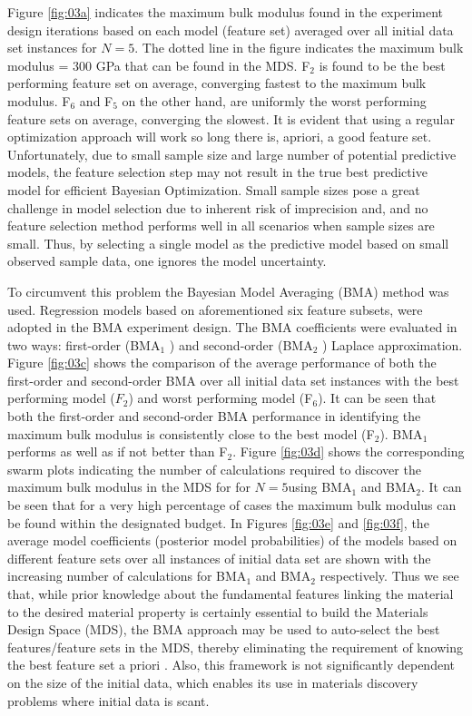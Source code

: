 \documentclass[utf8]{frontiersSCNS} %
\begin{document}
Figure \ref{fig:03a} indicates the maximum bulk modulus found in the experiment design iterations based on each model (feature set) averaged over all initial data set instances for $N= 5$. The dotted line in the figure indicates the maximum bulk modulus = 300 GPa that can be found in the MDS. F$_2$ is found to be the best performing feature set on average, converging fastest to the maximum bulk modulus. F$_6$ and F$_5$ on the other hand, are uniformly the worst performing feature sets on average, converging the slowest. It is evident that using a regular optimization approach will work so long there is, apriori, a good feature set.   Unfortunately, due to small sample size and large number of potential predictive models, the feature selection step may not result in the true best predictive model for efficient Bayesian Optimization. Small sample sizes pose a great challenge in model selection due to inherent risk of imprecision and, and no feature selection method performs well in all scenarios when sample sizes are small. Thus, by selecting a single model as the predictive model based on small observed sample data, one ignores the model uncertainty. 

To circumvent this problem the Bayesian Model Averaging (BMA) method was used. Regression models based on aforementioned six feature subsets, were adopted in the BMA experiment design.  The BMA coefficients were evaluated in two ways: first-order (BMA$_1$ ) and second-order (BMA$_2$ ) Laplace approximation. Figure \ref{fig:03c}  shows the comparison of the average performance of both the first-order and second-order BMA over all initial data set instances with the best performing model ($F_2$) and worst performing model (F$_6$). It can be seen that both the first-order and second-order BMA performance in identifying the maximum bulk modulus is consistently close to the best model (F$_2$). BMA$_1$ performs as well as if not better than F$_2$. Figure \ref{fig:03d} shows the corresponding swarm plots indicating the number of calculations required to discover the maximum bulk modulus in the MDS for for $N = 5$using BMA$_1$ and BMA$_2$. It can be seen that for a very high percentage of cases the maximum bulk modulus can be found within the designated budget. In Figures \ref{fig:03e} and \ref{fig:03f}, the average model coefficients (posterior model probabilities) of the models based on different feature sets over all instances of initial data set are shown with the increasing number of calculations for BMA$_1$ and BMA$_2$ respectively.  Thus we see that, while prior knowledge about the fundamental features linking the material to the desired material property is certainly essential to build the Materials Design Space (MDS), the BMA approach may be used to auto-select the best features/feature sets in the MDS, thereby eliminating the requirement of knowing the best feature set a priori . Also, this framework is not significantly dependent on the size of the initial data, which enables its use in materials discovery problems where initial data is scant.
\end{document}
